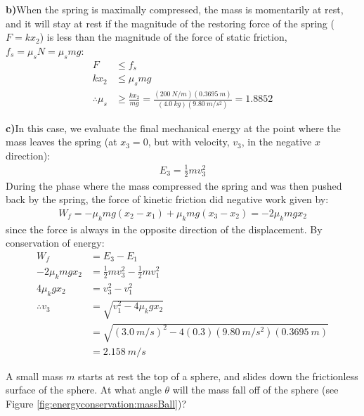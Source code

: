 \begin{solution}
\textbf{b)}When the spring is maximally compressed, the mass is momentarily at rest, and it will stay at rest if the magnitude of the restoring force of the spring ($F=kx_2$) is less than the magnitude of the force of static friction, $f_s=\mu_sN=\mu_smg$:
\begin{align*}
F &\leq f_s\\
kx_2 &\leq \mu_smg\\
\therefore \mu_s &\geq \frac{kx_2}{mg}=\frac{(\SI{200}{N/m})(\SI{0.3695}{m})}{(\SI{4.0}{kg})(\SI{9.80}{m/s^2})}=1.8852
\end{align*}

\textbf{c)}In this case, we evaluate the final mechanical energy at the point where the mass leaves the spring (at $x_3=0$, but with velocity, $v_3$, in the negative $x$ direction):
\begin{align*}
E_3=\frac{1}{2}mv_3^2
\end{align*}
During the phase where the mass compressed the spring and was then pushed back by the spring, the force of kinetic friction did negative work given by:
\begin{align*}
W_f = -\mu_kmg(x_2-x_1)+\mu_kmg(x_3-x_2)=-2\mu_kmgx_2
\end{align*}
since the force is always in the opposite direction of the displacement. By conservation of energy:
\begin{align*}
W_f &= E_3 - E_1\\
-2\mu_kmgx_2 &= \frac{1}{2}mv_3^2 - \frac{1}{2}mv_1^2\\
4\mu_kgx_2&=v_3^2-v_1^2\\
\therefore v_3 &= \sqrt{v_1^2-4\mu_kgx_2}\\
&=\sqrt{(\SI{3.0}{m/s})^2-4(0.3)(\SI{9.80}{m/s^2})(\SI{0.3695}{m})}\\
&=\SI{2.158}{m/s}
\end{align*}
\end{solution}

\question A small mass $m$ starts at rest the top of a sphere, and slides down the frictionless surface of the sphere. At what angle $\theta$ will the mass fall off of the sphere (see Figure \ref{fig:energyconservation:massBall})?

